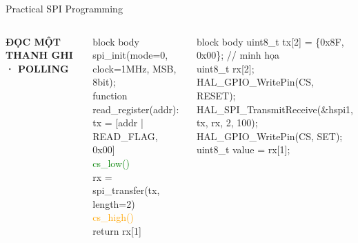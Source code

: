 \documentclass[10pt,aspectratio=169]{beamer}
\begin{document}
\begin{frame}[shrink=2]{Practical SPI Programming}
\transwipe[direction=0,duration=.35]
\vspace{-.2cm}
\begin{columns}[T,onlytextwidth]
{\color{cyan}\bfseries ĐỌC MỘT THANH GHI · POLLING}\par\vspace{.18cm}
\begin{beamercolorbox}[rounded=true,sep=7pt]{block body}
{\ttfamily\scriptsize
spi\_init(mode=0, clock=1MHz, MSB, 8bit);\\[3pt]
function read\_register(addr):\\
\hspace*{1em}tx = [addr | READ\_FLAG, 0x00]\\
\hspace*{1em}\textcolor{green}{cs\_low()}\\
\hspace*{1em}rx = spi\_transfer(tx, length=2)\\
\hspace*{1em}\textcolor{orange}{cs\_high()}\\
\hspace*{1em}return rx[1]
}
\end{beamercolorbox}
\vspace{.25cm}
\begin{beamercolorbox}[rounded=true,sep=7pt]{block body}
{\ttfamily\scriptsize
uint8\_t tx[2] = \{0x8F, 0x00\}; // minh họa\\
uint8\_t rx[2];\\[2pt]
HAL\_GPIO\_WritePin(CS, RESET);\\
HAL\_SPI\_TransmitReceive(\&hspi1, tx, rx, 2, 100);\\
HAL\_GPIO\_WritePin(CS, SET);\\
uint8\_t value = rx[1];
}
\end{beamercolorbox}


\end{columns}
\end{frame}
\end{document}
